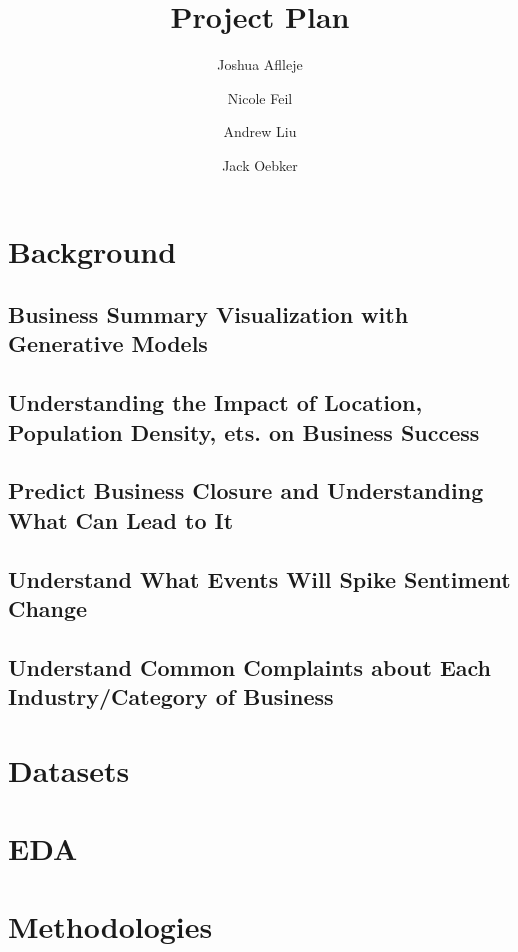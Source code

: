 \documentclass{article}
\title{Project Plan}
\author{Joshua Aflleje}
\author{Nicole Feil}
\author{Andrew Liu}
\author{Jack Oebker}
\affil{Arizona State University, Tempe, AZ 85281, USA}
\begin{document}
\maketitle

\section{Background}


\subsection{Business Summary Visualization with Generative Models}


\subsection{Understanding the Impact of Location, Population Density, ets. on Business Success}


\subsection{Predict Business Closure and Understanding What Can Lead to It}


\subsection{Understand What Events Will Spike Sentiment Change}


\subsection{Understand Common Complaints about Each Industry/Category of Business}


\section{Datasets}


\section{EDA}


\section{Methodologies}


\newpage

\nocite{*}

\end{document}
